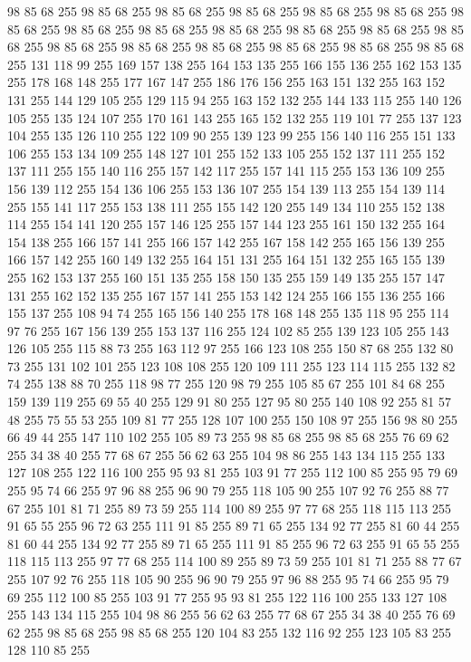 98 85 68 255 98 85 68 255 98 85 68 255 98 85 68 255 98 85 68 255 98 85 68 255 98 85 68 255 98 85 68 255 98 85 68 255 98 85 68 255 98 85 68 255 98 85 68 255 98 85 68 255 98 85 68 255 98 85 68 255 98 85 68 255 98 85 68 255 98 85 68 255 98 85 68 255 131 118 99 255 169 157 138 255 164 153 135 255 166 155 136 255 162 153 135 255 178 168 148 255 177 167 147 255 186 176 156 255 163 151 132 255 163 152 131 255 144 129 105 255 129 115 94 255 163 152 132 255 144 133 115 255 140 126 105 255 135 124 107 255 170 161 143 255 165 152 132 255 119 101 77 255 137 123 104 255 135 126 110 255 122 109 90 255 139 123 99 255 156 140 116 255 151 133 106 255 153 134 109 255 148 127 101 255 152 133 105 255 152 137 111 255 152 137 111 255 155 140 116 255 157 142 117 255 157 141 115 255 153 136 109 255 156 139 112 255 154 136 106 255 153 136 107 255 154 139 113 255 154 139 114 255 155 141 117 255 153 138 111 255 155 142 120 255 149 134 110 255 152 138 114 255 154 141 120 255
157 146 125 255 157 144 123 255 161 150 132 255 164 154 138 255 166 157 141 255 166 157 142 255 167 158 142 255 165 156 139 255 166 157 142 255 160 149 132 255 164 151 131 255 164 151 132 255 165 155 139 255 162 153 137 255 160 151 135 255 158 150 135 255 159 149 135 255 157 147 131 255 162 152 135 255 167 157 141 255 153 142 124 255 166 155 136 255 166 155 137 255 108 94 74 255 165 156 140 255 178 168 148 255 135 118 95 255 114 97 76 255 167 156 139 255 153 137 116 255 124 102 85 255 139 123 105 255 143 126 105 255 115 88 73 255 163 112 97 255 166 123 108 255 150 87 68 255 132 80 73 255 131 102 101 255 123 108 108 255 120 109 111 255 123 114 115 255 132 82 74 255 138 88 70 255 118 98 77 255 120 98 79 255 105 85 67 255 101 84 68 255 159 139 119 255 69 55 40 255 129 91 80 255 127 95 80 255 140 108 92 255 81 57 48 255 75 55 53 255 109 81 77 255 128 107 100 255 150 108 97 255 156 98 80 255 66 49 44 255 147 110 102 255 105 89 73 255 98 85 68 255 98 85 68 255
76 69 62 255 34 38 40 255 77 68 67 255 56 62 63 255 104 98 86 255 143 134 115 255 133 127 108 255 122 116 100 255 95 93 81 255 103 91 77 255 112 100 85 255 95 79 69 255 95 74 66 255 97 96 88 255 96 90 79 255 118 105 90 255 107 92 76 255 88 77 67 255 101 81 71 255 89 73 59 255 114 100 89 255 97 77 68 255 118 115 113 255 91 65 55 255 96 72 63 255 111 91 85 255 89 71 65 255 134 92 77 255 81 60 44 255 81 60 44 255 134 92 77 255 89 71 65 255 111 91 85 255 96 72 63 255 91 65 55 255 118 115 113 255 97 77 68 255 114 100 89 255 89 73 59 255 101 81 71 255 88 77 67 255 107 92 76 255 118 105 90 255 96 90 79 255 97 96 88 255 95 74 66 255 95 79 69 255 112 100 85 255 103 91 77 255 95 93 81 255 122 116 100 255 133 127 108 255 143 134 115 255 104 98 86 255 56 62 63 255 77 68 67 255 34 38 40 255 76 69 62 255 98 85 68 255 98 85 68 255 120 104 83 255 132 116 92 255 123 105 83 255 128 110 85 255

